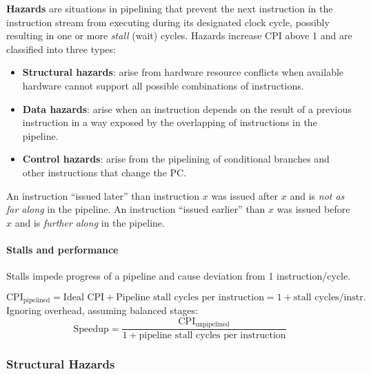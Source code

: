 \begin{definition}
\textbf{Hazards} are situations in pipelining that prevent the next
instruction in the instruction stream from executing during its designated
clock cycle, possibly resulting in one or more \emph{stall} (wait) cycles.
Hazards increase CPI above 1 and are classified into three types:

\begin{itemize}
  \item \textbf{Structural hazards}: arise from hardware resource conflicts
  when available hardware cannot support all possible combinations of
  instructions.
  \item \textbf{Data hazards}: arise when an instruction depends on the
  result of a previous instruction in a way exposed by the overlapping of
  instructions in the pipeline.
  \item \textbf{Control hazards}: arise from the pipelining of conditional
  branches and other instructions that change the PC.
\end{itemize}
\end{definition}

\begin{note}
An instruction ``issued later'' than instruction $x$
was issued after $x$ and is \emph{not as far along} in the pipeline. An
instruction ``issued earlier'' than $x$ was issued before $x$ and is
\emph{further along} in the pipeline.
\end{note}

\paragraph{Stalls and performance}

Stalls impede progress of a pipeline and cause deviation from 1
instruction/cycle.
\begin{prop}
\[
  \mathrm{CPI}_{\text{pipelined}} = \text{Ideal CPI} + \text{Pipeline stall cycles per instruction} = 1 + \text{stall cycles/instr.}
\]
Ignoring overhead, assuming balanced stages:
\[
  \text{Speedup} = \frac{\mathrm{CPI}_{\text{unpipelined}}}{1 + \text{pipeline stall cycles per instruction}}
\]
\end{prop}

\subsubsection{Structural Hazards}
\label{sec:structural-hazards}

